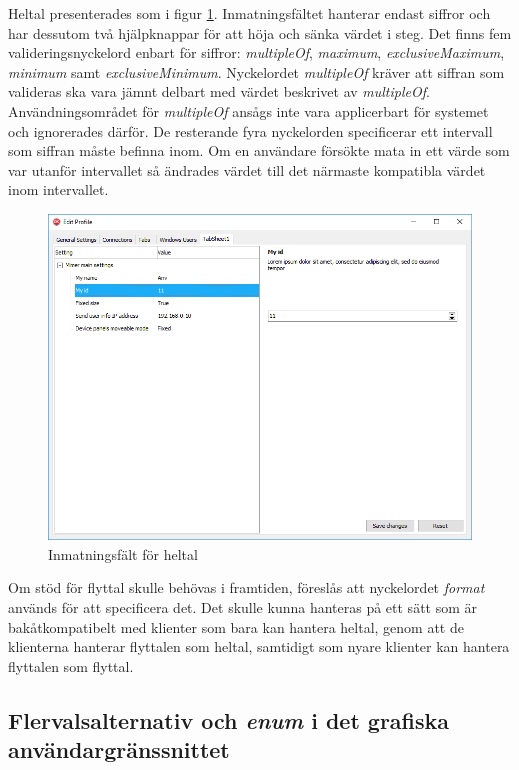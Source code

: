 Heltal presenterades som i figur \ref{fig:heltal}. Inmatningsfältet hanterar endast siffror och har dessutom två hjälpknappar för att höja och sänka värdet i steg. Det finns fem valideringsnyckelord enbart för siffror: \textit{multipleOf}, \textit{maximum}, \textit{exclusiveMaximum}, \textit{minimum} samt \textit{exclusiveMinimum}. Nyckelordet \textit{multipleOf} kräver att siffran som valideras ska vara jämnt delbart med värdet beskrivet av \textit{multipleOf}. Användningsområdet för \textit{multipleOf} ansågs inte vara applicerbart för systemet och ignorerades därför. De resterande fyra nyckelorden specificerar ett intervall som siffran måste befinna inom. Om en användare försökte mata in ett värde som var utanför intervallet så ändrades värdet till det närmaste kompatibla värdet inom intervallet. \cite{Andrews2018}

\begin{figure}
	\includegraphics[width=\textwidth]{./images/gui/heltal.png}
	\vspace{-1.7em}
	\caption{Inmatningsfält för heltal}
	\label{fig:heltal}
\end{figure}

Om stöd för flyttal skulle behövas i framtiden, föreslås att nyckelordet \textit{format} används för att specificera det. Det skulle kunna hanteras på ett sätt som är bakåtkompatibelt med klienter som bara kan hantera heltal, genom att de klienterna hanterar flyttalen som heltal, samtidigt som nyare klienter kan hantera flyttalen som flyttal.

\FloatBarrier
\subsection{Flervalsalternativ och \textit{enum} i det grafiska användargränssnittet}
\label{sec:arbetet:gui:enum}

